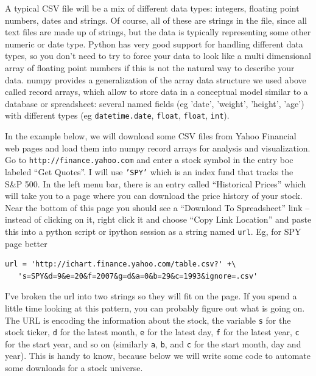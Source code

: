 A typical CSV file will be a mix of different data types: integers,
floating point numbers, dates and strings.  Of course, all of these
are strings in the file, since all text files are made up of strings,
but the data is typically representing some other numeric or date
type.  Python has very good support for handling different data types,
so you don't need to try to force your data to look like a multi
dimensional array of floating point numbers if this is not the natural
way to describe your data.  numpy provides a generalization of the
array data structure we used above called record arrays, which allow
to store data in a conceptual model similar to a database or
spreadsheet: several named fields (eg 'date', 'weight', 'height',
'age') with different types (eg \texttt{datetime.date}, \texttt{float},
\texttt{float}, \texttt{int}).

In the example below, we will download some CSV files from Yahoo
Financial web pages and load them into numpy record arrays for
analysis and visualization.  Go to \texttt{http://finance.yahoo.com}
and enter a stock symbol in the entry boc labeled ``Get Quotes''.  I
will use \texttt{'SPY'} which is an index fund that tracks the S\&P
500.  In the left menu bar, there is an entry called ``Historical
Prices'' which will take you to a page where you can download the
price history of your stock.  Near the bottom of this page you should
see a ``Download To Spreadsheet'' link -- instead of clicking on it,
right click it and choose ``Copy Link Location'' and paste this into a
python script or ipython session as a string named \texttt{url}.  Eg,
for SPY page better

\begin{lstlisting}
url = 'http://ichart.finance.yahoo.com/table.csv?' +\
   's=SPY&d=9&e=20&f=2007&g=d&a=0&b=29&c=1993&ignore=.csv'
\end{lstlisting}

\noindent I've broken the url into two strings so they will fit on the
page.  If you spend a little time looking at this pattern, you can
probably figure out what is going on.  The URL is encoding the
information about the stock, the variable \texttt{s} for the stock
ticker, \texttt{d} for the latest month, \texttt{e} for the latest
day, \texttt{f} for the latest year, \texttt{c} for the start year,
and so on (similarly \texttt{a}, \texttt{b}, and \texttt{c} for the
start month, day and year).  This is handy to know, because below we
will write some code to automate some downloads for a stock universe.

